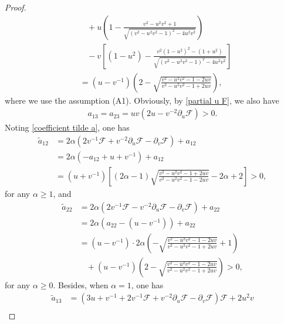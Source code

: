 \documentclass[10pt,a4paper]{amsart}
\begin{document}
\begin{proof}
\begin{equation*}
\begin{aligned}
			& \ \ \ \ + u \left(   1- \frac{v^2-u^{2}v^2+1 }{\sqrt{(v^2-u^{2}v^2-1)^2 -4u^{2}v^{2} }}  \right) \\
			& \ \ \ \  - v \left[ (1-u^2) - \frac{v^2(1-u^{2})^{2} - (1+u^2) }{\sqrt{(v^2-u^{2}v^2-1)^2 -4u^{2}v^{2} }} \right]   \\
			& = (u-v^{-1}) \left( 2- \sqrt{\frac{v^2-u^{2}v^2-1-2uv}{v^2-u^{2}v^2-1+2uv}} \right),
		\end{aligned}
	\end{equation*}	
	where we use the assumption (A1). Obviously, by \eqref{partial u F}, we also have
	\begin{equation*} 
		\begin{aligned}
			a_{13} = a_{23} = uv(2u-v^{-2}\partial_{u}\mathcal{F})> 0.
		\end{aligned}
	\end{equation*}	
	Noting \eqref{coefficient tilde a}, one has
	\begin{equation} 
		\begin{aligned}
			\tilde{a}_{12} & = 2\alpha (2v^{-1}\mathcal{F}+ v^{-2} \partial_{u}\mathcal{F} - \partial_{v}\mathcal{F}) + {a}_{12} \\
			& = 2\alpha (- a_{12} +u +v^{-1}) + {a}_{12}\\
			& = (u +v^{-1}) \left[  (2 \alpha -1) \sqrt{\frac{v^2-u^{2}v^2-1+2uv}{v^2-u^{2}v^2-1-2uv}} - 2 \alpha+2  \right] > 0,
		\end{aligned}
	\end{equation}	
	for any $ \alpha \geq 1$, and
	\begin{equation}
		\begin{aligned}
			\tilde{a}_{22} & = 2\alpha (2v^{-1}\mathcal{F}- v^{-2} \partial_{u}\mathcal{F} - \partial_{v}\mathcal{F}) + {a}_{22} \\
			& = 2\alpha (a_{22} -(u -v^{-1})) + {a}_{22}\\
			& = (u -v^{-1}) \cdot  2 \alpha \left( -  \sqrt{\frac{v^2-u^{2}v^2-1-2uv}{v^2-u^{2}v^2-1+2uv}} +1 \right) \\
			& \ \ \ \ + (u -v^{-1}) \left(  2 - \sqrt{\frac{v^2-u^{2}v^2-1-2uv}{v^2-u^{2}v^2-1+2uv}} \right) > 0,
		\end{aligned}
	\end{equation}	
	for any $ \alpha \geq 0$. Besides, when $ \alpha =1$, one has
	\begin{equation*} 
		\begin{aligned}
			\tilde{a}_{13} &= ( 3u + v^{-1} + 2v^{-1} \mathcal{F} + v^{-2}  \partial_{u} \mathcal{F} - \partial_{v} \mathcal{F} ) \mathcal{F} + 2u^2 v \\

\end{aligned}
\end{equation*}
\end{proof}
\end{document}
